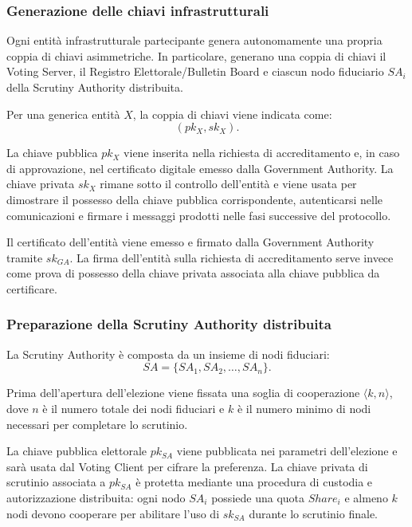 \documentclass[a4paper,12pt]{article}
\begin{document}
\subsubsection{Generazione delle chiavi infrastrutturali}

Ogni entit\`a infrastrutturale partecipante genera autonomamente una propria coppia di chiavi asimmetriche. 
In particolare, generano una coppia di chiavi il Voting Server, il Registro Elettorale/Bulletin Board e ciascun nodo fiduciario \(SA_i\) della Scrutiny Authority distribuita.

Per una generica entit\`a \(X\), la coppia di chiavi viene indicata come:
\[
	(pk_X, sk_X).
\]

La chiave pubblica \(pk_X\) viene inserita nella richiesta di accreditamento e, in caso di approvazione, nel certificato digitale emesso dalla Government Authority. 
La chiave privata \(sk_X\) rimane sotto il controllo dell'entit\`a e viene usata per dimostrare il possesso della chiave pubblica corrispondente, autenticarsi nelle comunicazioni e firmare i messaggi prodotti nelle fasi successive del protocollo.

Il certificato dell'entit\`a viene emesso e firmato dalla Government Authority tramite \(sk_{GA}\). 
La firma dell'entit\`a sulla richiesta di accreditamento serve invece come prova di possesso della chiave privata associata alla chiave pubblica da certificare.

\subsubsection{Preparazione della Scrutiny Authority distribuita}

La Scrutiny Authority \`e composta da un insieme di nodi fiduciari:
\[
	SA = \{SA_1, SA_2, \dots, SA_n\}.
\]

Prima dell'apertura dell'elezione viene fissata una soglia di cooperazione \(\langle k,n\rangle\), dove \(n\) \`e il numero totale dei nodi fiduciari e \(k\) \`e il numero minimo di nodi necessari per completare lo scrutinio.

La chiave pubblica elettorale \(pk_{SA}\) viene pubblicata nei parametri dell'elezione e sar\`a usata dal Voting Client per cifrare la preferenza. 
La chiave privata di scrutinio associata a \(pk_{SA}\) \`e protetta mediante una procedura di custodia e autorizzazione distribuita: ogni nodo \(SA_i\) possiede una quota \(Share_i\) e almeno \(k\) nodi devono cooperare per abilitare l'uso di \(sk_{SA}\) durante lo scrutinio finale.
\end{document}
